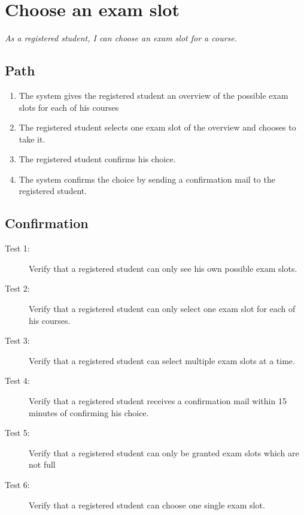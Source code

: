 \section{Choose an exam slot}

\par \emph{As a registered student, I can choose an exam slot for a course.}

\subsection{Path}

\begin{enumerate}
  \item The system gives the registered student an overview of the possible exam
  slots for each of his courses
  \item The registered student selects one exam slot of the overview and chooses
  to take it.
  \item The registered student confirms his choice.
  \item The system confirms the choice by sending a confirmation mail to the
  registered student.
\end{enumerate}

\subsection{Confirmation}

\begin{description}
\item[Test 1:] Verify that a registered student can only see his own possible
exam slots.
\item[Test 2:] Verify that a registered student can only select one exam slot
for each of his courses.
\item[Test 3:] Verify that a registered student can select multiple exam slots
at a time.
\item[Test 4:] Verify that a registered student receives a confirmation mail
within 15 minutes of confirming his choice.
\item[Test 5:] Verify that a registered student can only be granted exam slots
which are not full
\item[Test 6:] Verify that a registered student can choose one single exam slot.
\end{description}